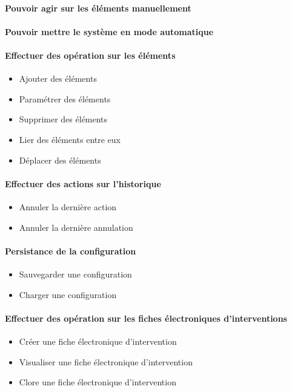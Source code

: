 {
	\paragraph{ Pouvoir agir sur les éléments manuellement}
	\paragraph{ Pouvoir mettre le système en mode automatique}
}
{
\paragraph{Effectuer des opération sur les éléments }
\begin{itemize}
	\item Ajouter des éléments
	\item Paramétrer des éléments
	\item Supprimer des éléments
	\item Lier des éléments entre eux
	\item Déplacer des éléments
\end{itemize}

\paragraph{Effectuer des actions sur l'historique}
\begin{itemize}
	\item Annuler la dernière action
	\item Annuler la dernière annulation
\end{itemize}

\paragraph{Persistance de la configuration}
\begin{itemize}
	\item Sauvegarder une configuration
	\item Charger une configuration
\end{itemize}

\paragraph{Effectuer des opération sur les fiches électroniques d'interventions}
\begin{itemize}
	\item Créer une fiche électronique d'intervention
	\item Visualiser une fiche électronique d'intervention
	\item Clore une fiche électronique d'intervention
\end{itemize}

}
